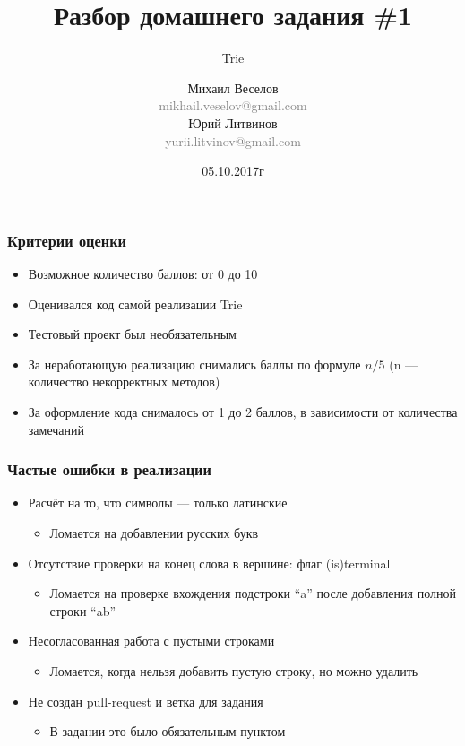 \documentclass[xetex,mathserif,serif]{beamer}
\title{Разбор домашнего задания \#1}
\subtitle{Trie}
\author[Михаил Веселов, Юрий Литвинов]{
	Михаил Веселов\\\small{\textcolor{gray}{mikhail.veselov@gmail.com}}\\
	\vspace{3mm}
	Юрий Литвинов\\\small{\textcolor{gray}{yurii.litvinov@gmail.com}}
}
\date{05.10.2017г}
\begin{document}
	\frame{\titlepage}

	\begin{frame}
		\frametitle{Критерии оценки}
		\begin{itemize}
			\item Возможное количество баллов: от 0 до 10
			\item Оценивался код самой реализации Trie
			\item Тестовый проект был необязательным
			\item За неработающую реализацию снимались баллы по формуле $n / 5$ (n --- количество некорректных методов)
			\item За оформление кода снималось от 1 до 2 баллов, в зависимости от количества замечаний
		\end{itemize}
	\end{frame}

	\begin{frame}
		\frametitle{Частые ошибки в реализации}
		\begin{itemize}
			\item Расчёт на то, что символы --- только латинские
			\begin{itemize}
				\item Ломается на добавлении русских букв
			\end{itemize}
			\item Отсутствие проверки на конец слова в вершине: \newline 
				флаг (is)terminal
			\begin{itemize}
				\item Ломается на проверке вхождения подстроки ``a'' после добавления полной строки ``ab''
			\end{itemize}
			\item Несогласованная работа с пустыми строками
			\begin{itemize}
				\item Ломается, когда нельзя добавить пустую строку, но можно удалить
			\end{itemize}
			\item Не создан pull-request и ветка для задания
			\begin{itemize}
				\item В задании это было обязательным пунктом
			\end{itemize}
		\end{itemize}
	\end{frame}
\end{document}
